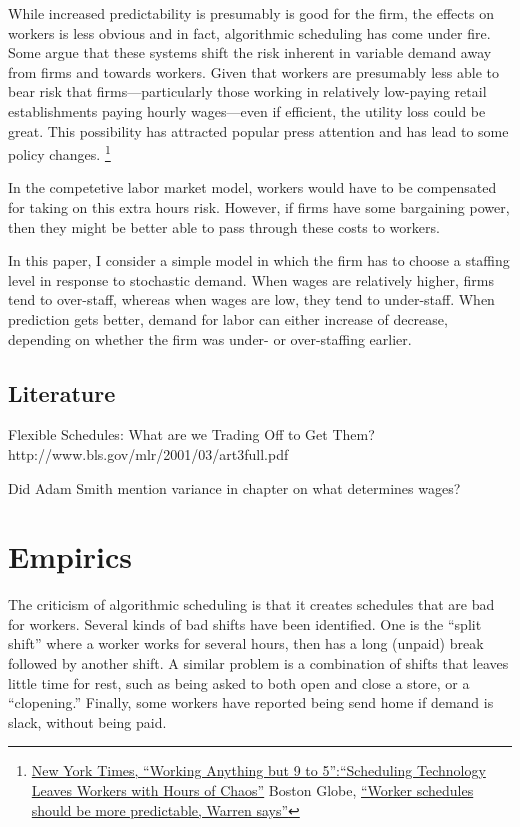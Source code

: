 \documentclass[11pt]{article}
\begin{document}
While increased predictability is presumably is good for the firm, the effects on workers is less obvious and in fact, algorithmic scheduling has come under fire.
Some argue that these systems shift the risk inherent in variable demand away from firms and towards workers.
Given that workers are presumably less able to bear risk that firms---particularly those working in relatively low-paying retail establishments paying hourly wages---even if efficient, the utility loss could be great.
This possibility has attracted popular press attention and has lead to some policy changes. 
\footnote{
\href{http://www.nytimes.com/interactive/2014/08/13/us/starbucks-workers-scheduling-hours.html}{
  New York Times, ``Working Anything but 9 to 5'':``Scheduling Technology Leaves Workers with Hours of Chaos''}
Boston Globe,
\href{https://www.bostonglobe.com/2015/07/20/sen-warren-worker-schedules-should-more-predictable/lVt0dtlVaEGCsqT7SXztRJ/story.html}{ ``Worker schedules should be more predictable, Warren says''}
}

In the competetive labor market model, workers would have to be compensated for taking on this extra hours risk.
However, if firms have some bargaining power, then they might be better able to pass through these costs to workers. 

In this paper, I consider a simple model in which the firm has to choose a staffing level in response to stochastic demand.
When wages are relatively higher, firms tend to over-staff, whereas when wages are low, they tend to under-staff.
When prediction gets better, demand for labor can either increase of decrease, depending on whether the firm was under- or over-staffing earlier. 

\subsection{Literature}

Flexible Schedules: What are we Trading Off to Get Them? 
http://www.bls.gov/mlr/2001/03/art3full.pdf


Did Adam Smith mention variance in chapter on what determines wages?
\cite{smith1999wealth}

\cite{trejo1991effects}
\cite{crepon2002employed}
\cite{hamermesh2000demand}
\cite{skuterud2007identifying}


\section{Empirics}
The criticism of algorithmic scheduling is that it creates schedules that are bad for workers.
Several kinds of bad shifts have been identified.
One is the ``split shift'' where a worker works for several hours, then has a long (unpaid) break followed by another shift.
A similar problem is a combination of shifts that leaves little time for rest, such as being asked to both open and close a store, or a ``clopening.'' 
Finally, some workers have reported being send home if demand is slack, without being paid. 
\end{document}
